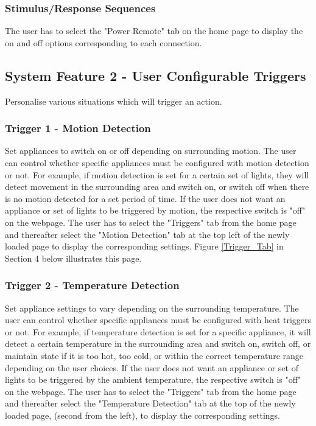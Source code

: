 \documentclass[11pt, a4paper]{article}
\newcounter{subsubsubsection}[subsubsection]
\begin{document}
	\subsubsection{Stimulus/Response Sequences}
	The user has to select the "Power Remote" tab on the home page to display the on and off options corresponding to each connection. 
	
	\subsection{System Feature 2 - User Configurable Triggers} 
	Personalise various situations which will trigger an action.
	\subsubsection{Trigger 1 - Motion Detection}
	Set appliances to switch on or off depending on surrounding motion. 
	The user can control whether specific appliances must be configured with motion detection or not. For example, if motion detection is set for a certain set of lights, they will detect movement in the surrounding area and switch on, or switch off when there is no motion detected for a set period of time. If the user does not want an appliance or set of lights to be triggered by motion, the respective switch is "off" on the webpage. 
	The user has to select the "Triggers" tab from the home page and thereafter select the "Motion Detection" tab at the top left of the newly loaded page to display the corresponding settings. Figure \ref{Trigger_Tab} in Section 4 below illustrates this page. 
	\subsubsection{Trigger 2 - Temperature Detection}
	Set appliance settings to vary depending on the surrounding temperature.
	The user can control whether specific appliances must be configured with heat triggers or not. For example, if temperature detection is set for a specific appliance, it will detect a certain temperature in the surrounding area and switch on, switch off, or maintain state if it is too hot, too cold, or within the correct temperature range depending on the user choices. If the user does not want an appliance or set of lights to be triggered by the ambient temperature, the respective switch is "off" on the webpage. 
	The user has to select the "Triggers" tab from the home page and thereafter select the "Temperature Detection" tab at the top of the newly loaded page, (second from the left), to display the corresponding settings.
\end{document}
